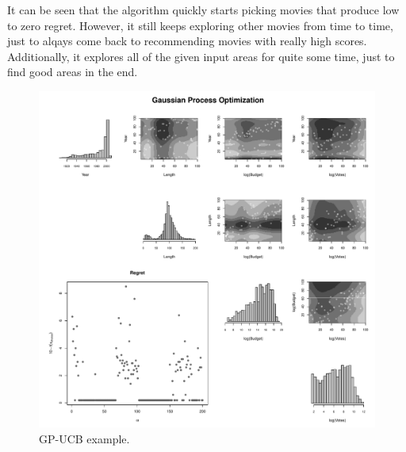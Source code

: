 \documentclass[authoryear,11pt,review]{elsarticle}
\begin{document}
It can be seen that the algorithm quickly starts picking movies that produce low to zero regret. However, it still keeps exploring other movies from time to time, just to alqays come back to recommending movies with really high scores. Additionally, it explores all of the given input areas for quite some time, just to find good areas in the end.
\begin{figure}[ht]
\caption{GP-UCB example.}
\label{gpucbmovies}
   \includegraphics[scale=0.55]{figs/gpopt.pdf}
\end{figure}
\FloatBarrier

\end{document}
